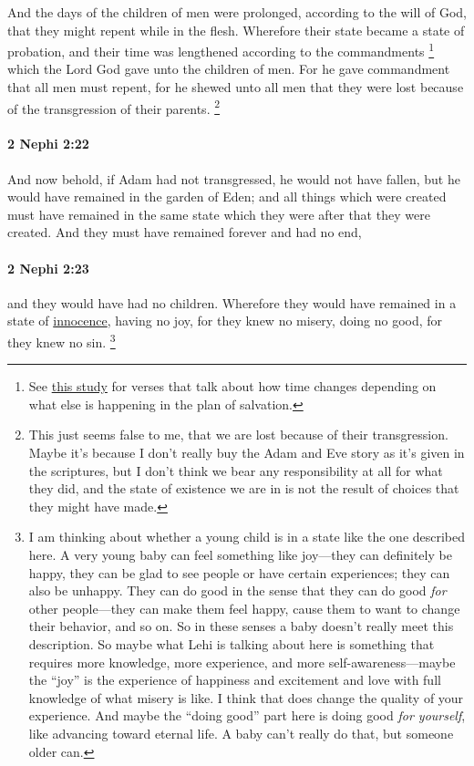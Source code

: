 			And the days of the children of men were prolonged,
			according to the will of God,
			that they might repent while in the flesh.
			Wherefore their state became a state of probation,
			and their time was lengthened according to the commandments%
				\footnote{%
					\label{2NEPHI-2-21-time}%
					See \hyperref[TIME-nature]{this study} for verses that talk about how time changes depending on what else is happening in the plan of salvation.
					}
			which the Lord God gave unto the children of men.
			For he gave commandment that all men must repent,
			for he shewed unto all men that they were lost
			because of the transgression of their parents.%
				\footnote{%
					\label{2NEPHI-2-21-lost}%
					This just seems false to me, that we are lost because of their transgression. Maybe it's because I don't really buy the Adam and Eve story as it's given in the scriptures, but I don't think we bear any responsibility at all for what they did, and the state of existence we are in is not the result of choices that they might have made.
					}

		\paragraph{2 Nephi 2:22} %
			\label{2NEPHI-2-22}

			And now behold, if Adam had not transgressed,
			he would not have fallen,
			but he would have remained in the garden of Eden;
			and all things which were created must have remained
			in the same state which they were
			after that they were created.
			And they must have remained forever and had no end,

		\paragraph{2 Nephi 2:23} %
			\label{2NEPHI-2-23}

			and they would have had no children.
			Wherefore they would have remained in a state of \hyperref[INNOCENCE-1828]{innocence},
			having no joy, for they knew no misery,
			doing no good, for they knew no sin.%
				\footnote{%
					\label{2NEPHI-2-23-baby}%
					I am thinking about whether a young child is in a state like the one described here. A very young baby can feel something like joy---they can definitely be happy, they can be glad to see people or have certain experiences; they can also be unhappy. They can do good in the sense that they can do good \textit{for} other people---they can make them feel happy, cause them to want to change their behavior, and so on. So in these senses a baby doesn't really meet this description. So maybe what Lehi is talking about here is something that requires more knowledge, more experience, and more self-awareness---maybe the ``joy'' is the experience of happiness and excitement and love with full knowledge of what misery is like. I think that does change the quality of your experience. And maybe the ``doing good'' part here is doing good \textit{for yourself}, like advancing toward eternal life. A baby can't really do that, but someone older can.
					}

